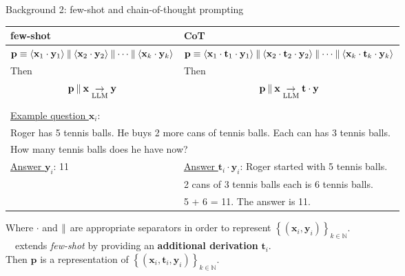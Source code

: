 \begin{frame}{Background 2: few-shot and chain-of-thought prompting}
\begin{table}
\small
\begin{tabular}{@{}p{} | p{}@{}}
\toprule
\textbf{few-shot} & \textbf{CoT} \\
\midrule
\(\mathbf{p} \equiv \langle \mathbf{x}_1 \cdot \mathbf{y}_1 \rangle \concat \langle \mathbf{x}_2 \cdot \mathbf{y}_2 \rangle \concat \dots \concat \langle \mathbf{x}_k \cdot \mathbf{y}_k \rangle\) & \(\mathbf{p} \equiv \langle \mathbf{x}_1 \cdot \mathbf{t}_1 \cdot \mathbf{y}_1 \rangle \concat \langle \mathbf{x}_2 \cdot \mathbf{t}_2 \cdot \mathbf{y}_2 \rangle \concat \dots \concat \langle \mathbf{x}_k \cdot \mathbf{t}_k \cdot \mathbf{y}_k \rangle\)\\
Then  \[\mathbf{p} \mathbin{\|} \mathbf{x} \underset{\text{LLM}}{\rightarrow} \mathbf{y}\] & Then \[\mathbf{p} \mathbin{\|} \mathbf{x} \underset{\text{LLM}}{\rightarrow} \mathbf{t} \cdot \mathbf{y}\] \\
\midrule
\multicolumn{2}{l}{\underline{Example question \(\mathbf{x}_i\)}: } \\
\multicolumn{2}{l}{Roger has 5 tennis balls. He buys 2 more cans of tennis balls. Each can has 3 tennis balls.} \\
\multicolumn{2}{l}{How many tennis balls does he have now?} \\
\midrule
\underline{Answer \(\mathbf{y}_i\)}: 11 & \underline{Answer \(\mathbf{t}_i \cdot \mathbf{y}_i\)}: Roger started with 5 tennis balls. \\
 & 2 cans of 3 tennis balls each is 6 tennis balls. \\
 & 5 + 6 = 11. The answer is 11.
\end{tabular}
\end{table}
Where \(\cdot\) and \(\mathbin{\|}\) are appropriate separators in order to represent \(\left\{(\mathbf{x}_i, \mathbf{y}_i)\right\}_{k\in \mathds{N}}\).\\
\textrightarrow\ \CoT\ extends \textit{few-shot} by providing an \textbf{additional derivation} \(\mathbf{t}_i\). \\
Then \(\mathbf{p}\) is a representation of \(\left\{(\mathbf{x}_i, \mathbf{t}_i, \mathbf{y}_i)\right\}_{k\in \mathds{N}}\).


\end{frame}